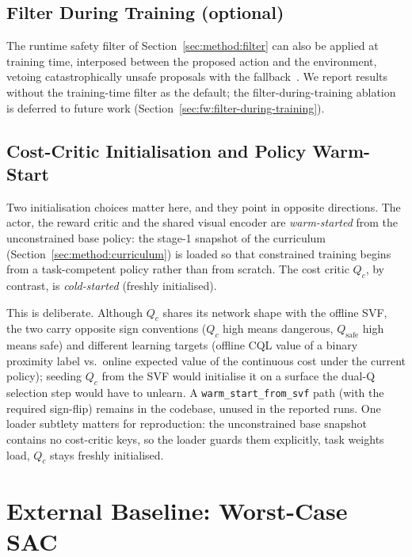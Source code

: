 \documentclass[11pt,a4paper]{report}
\begin{document}
\subsection{Filter During Training (optional)}
\label{sec:method:lagrangian:filter-train}

The runtime safety filter of Section~\ref{sec:method:filter} can
also be applied at training time, interposed between the proposed
action and the environment, vetoing catastrophically unsafe
proposals with the fallback~\cite{cbfrl2024,shield2025}. We report
results without the training-time filter as the default; the
filter-during-training ablation is deferred to future work
(Section~\ref{sec:fw:filter-during-training}).

\subsection{Cost-Critic Initialisation and Policy Warm-Start}
\label{sec:method:lagrangian:warmstart}

Two initialisation choices matter here, and they point in opposite
directions. The actor, the reward critic and the shared visual encoder
are \emph{warm-started} from the unconstrained base policy: the
stage-1 snapshot of the curriculum
(Section~\ref{sec:method:curriculum}) is loaded so that constrained
training begins from a task-competent policy rather than from scratch.
The cost critic $Q_c$, by contrast, is \emph{cold-started} (freshly
initialised).

This is deliberate. Although $Q_c$ shares its network shape with the
offline SVF, the two carry opposite sign conventions ($Q_c$ high
means dangerous, $Q_{\mathrm{safe}}$ high means safe) and different
learning targets (offline CQL value of a binary proximity label vs.\
online expected value of the continuous cost under the current
policy); seeding $Q_c$ from the SVF would initialise it on a surface
the dual-Q selection step would have to unlearn. A
\texttt{warm\_start\_from\_svf} path (with the required sign-flip)
remains in the codebase, unused in the reported runs. One loader
subtlety matters for reproduction: the unconstrained base
snapshot contains no cost-critic keys, so the loader guards them
explicitly, task weights load, $Q_c$ stays freshly initialised.


\section{External Baseline: Worst-Case SAC}
\label{sec:method:wcsac}
\end{document}
